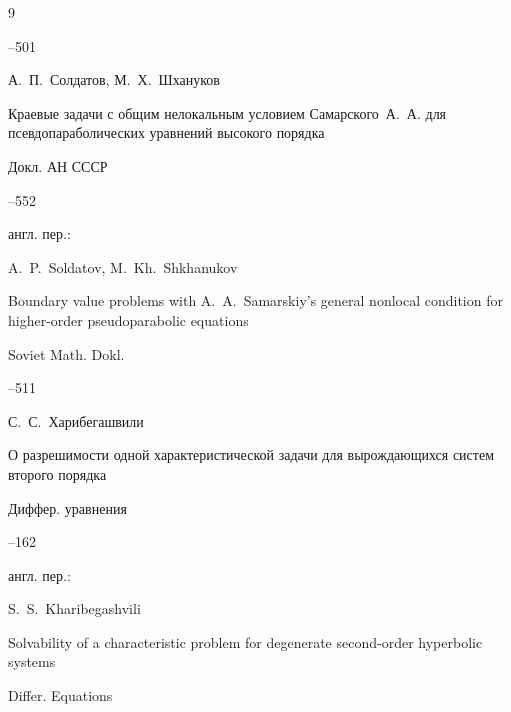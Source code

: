\begin{thebibliography}{9}


--501






\by А.~П.~Солдатов, М.~Х.~Шхануков

\paper Краевые задачи с общим нелокальным условием Самарского~А.~А. для псевдопараболических уравнений высокого порядка

\jour Докл. АН СССР




--552

\transl англ. пер.:~

\by A.~P.~Soldatov, M.~Kh.~Shkhanukov 

\paper Boundary value problems with A.~A.~Samarskiy's general nonlocal condition for higher-order pseudoparabolic equations

\jour Soviet Math. Dokl. 




–511 




\by С.~С.~Харибегашвили

\paper О разрешимости одной характеристической задачи для вырождающихся систем второго порядка 

\jour Диффер. уравнения 




--162

\transl англ. пер.:~

\by S.~S.~Kharibegashvili

\paper Solvability of a characteristic problem for degenerate second-order hyperbolic systems 

\jour Differ. Equations 



\end{thebibliography}
